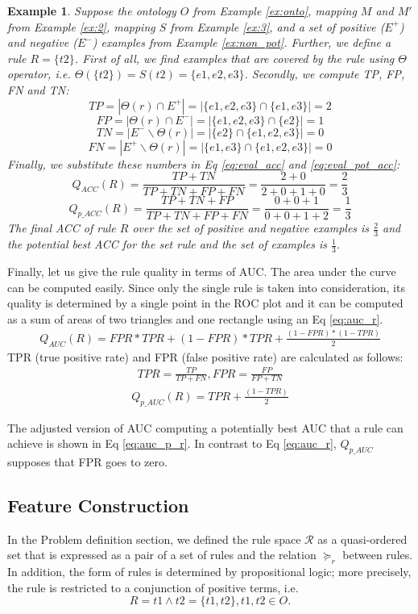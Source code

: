 \documentclass{bmcart}
\newtheorem{example}{Example}
\begin{document}
\begin{example}
Suppose the ontology $O$ from Example \ref{ex:onto}, mapping $M$ and $M'$ from Example \ref{ex:2}, mapping $S$ from Example \ref{ex:3}, and a set of positive ($E^{+}$) and negative ($E^{-}$) examples from Example \ref{ex:non_pot}. Further, we define a rule $R=\{t2\}$. First of all, we find examples that are covered by the rule using $\Theta$ operator, i.e. $\Theta(\{t2\}) = S(t2) = \{e1, e2, e3\}$. Secondly, we compute TP, FP, FN and TN:
$$TP = |\Theta(r) \cap E^{+}| = |\{e1, e2, e3\} \cap \{e1, e3\}| = 2$$
$$FP = |\Theta(r) \cap E^{-}| = |\{e1, e2, e3\} \cap \{e2\}| = 1$$
$$TN = |E^{-} \backslash \Theta(r)| = |\{e2\} \cap \{e1, e2, e3\}| = 0$$
$$FN = |E^{+} \backslash \Theta(r)| = |\{e1, e3\} \cap \{e1, e2, e3\}| = 0$$
Finally, we substitute these numbers in Eq \ref{eq:eval_acc} and \ref{eq:eval_pot_acc}:
$$Q_{ACC}(R) = \frac{TP + TN}{TP + TN + FP + FN} = \frac{2 + 0}{2 + 0 + 1 + 0} = \frac{2}{3}$$
$$Q_{p\_ACC}(R) = \frac{TP + TN + FP}{TP + TN + FP + FN}= \frac{0 + 0 + 1}{0 + 0 + 1 + 2} = \frac{1}{3}$$
The final ACC of rule $R$ over the set of positive and negative examples is $\frac{2}{3}$ and the potential best ACC for the set rule and the set of examples is $\frac{1}{3}$.
\end{example}

Finally, let us give the rule quality in terms of AUC. The area under the curve can be computed easily. Since only the single rule is taken into consideration, its quality is determined by a single point in the ROC plot and it can be computed as a sum of areas of two triangles and one rectangle using an Eq \ref{eq:auc_r}.
\begin{eqnarray} \label{eq:auc_r}
    Q_{AUC}(R) = FPR*TPR + (1-FPR)*TPR + \frac{(1-FPR)*(1-TPR)}{2}
\end{eqnarray}
TPR (true positive rate) and FPR (false positive rate) are calculated as follows:
\begin{eqnarray} \label{eq:auc_tpr_fpr}
    TPR=\frac{TP}{TP+FN}, FPR=\frac{FP}{FP+TN}
\end{eqnarray}
\begin{eqnarray} \label{eq:auc_p_r}
    Q_{p\_AUC}(R) = TPR + \frac{(1-TPR)}{2} 
\end{eqnarray}

The adjusted version of AUC computing a potentially best AUC that a rule can achieve is shown in Eq \ref{eq:auc_p_r}. In contrast to Eq \ref{eq:auc_r}, $Q_{p\_AUC}$ supposes that FPR goes to zero.


\subsection*{Feature Construction}\label{ref:feature_selection}
In the Problem definition section, we defined the rule space $\mathcal{R}$ as a quasi-ordered set that is expressed as a pair of a set of rules and the relation $\succeq_{r}$ between rules. In addition, the form of rules is determined by propositional logic; more precisely, the rule is restricted to a conjunction of positive terms, i.e.
$$R=t1 \wedge t2 = \{t1,t2\}, t1,t2 \in O.$$
\end{document}
